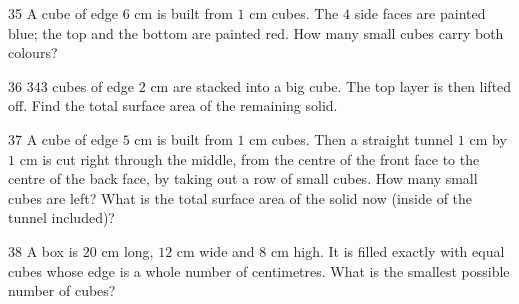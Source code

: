 \gap
\begin{probbox}{35}{}
A cube of edge $6$ cm is built from $1$ cm cubes. The $4$ side faces are painted blue; the top and the bottom are painted red. How many small cubes carry both colours?
\end{probbox}
\gap
\begin{probbox}{36}{}
$343$ cubes of edge $2$ cm are stacked into a big cube. The top layer is then lifted off. Find the total surface area of the remaining solid.
\end{probbox}
\gap
\begin{probbox}{37}{}
A cube of edge $5$ cm is built from $1$ cm cubes. Then a straight tunnel $1$ cm by $1$ cm is cut right through the middle, from the centre of the front face to the centre of the back face, by taking out a row of small cubes. How many small cubes are left? What is the total surface area of the solid now (inside of the tunnel included)?
\end{probbox}
\gap
\begin{probbox}{38}{}
A box is $20$ cm long, $12$ cm wide and $8$ cm high. It is filled exactly with equal cubes whose edge is a whole number of centimetres. What is the smallest possible number of cubes?
\end{probbox}
